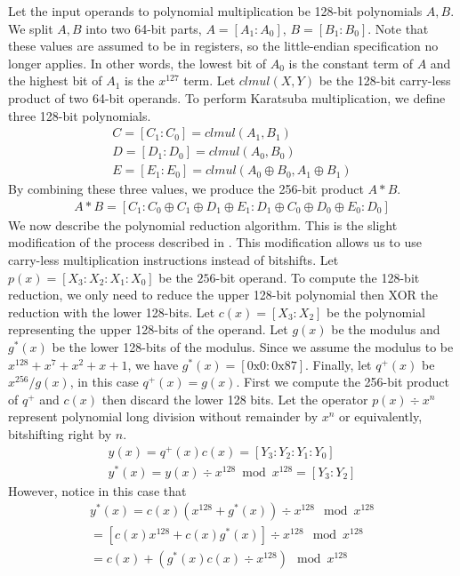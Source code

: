 \documentclass[hctr.tex]{subfiles}
\begin{document}
Let the input operands to polynomial multiplication be 128-bit polynomials $A, B$. We split $A, B$ into two 64-bit parts, $A = [A_1 : A_0]$, $B = [B_1 : B_0]$. Note that these values are assumed to be in registers, so the little-endian specification no longer applies. In other words, the lowest bit of $A_0$ is the constant term of $A$ and the highest bit of $A_1$ is the $x^{127}$ term. Let $clmul(X, Y)$ be the 128-bit carry-less product of two 64-bit operands. To perform Karatsuba multiplication, we define three 128-bit polynomials.
\begin{gather*}
       C = [C_1 : C_0] = clmul(A_1, B_1)\\
       D = [D_1 : D_0] = clmul(A_0, B_0)\\
       E = [E_1 : E_0] = clmul(A_0 \oplus B_0, A_1 \oplus B_1)
\end{gather*}
By combining these three values, we produce the 256-bit product $A * B$.
\begin{align*}
       A * B = [C_1 : C_0 \oplus C_1 \oplus D_1 \oplus E_1 : D_1 \oplus C_0 \oplus D_0 \oplus E_0 : D_0]
\end{align*}
We now describe the polynomial reduction algorithm. This is the slight modification of the process described in \cite{CLMUL}. This modification allows us to use carry-less multiplication instructions instead of bitshifts. Let $p(x) = [X_3 : X_2 : X_1 : X_0]$ be the $256$-bit operand. To compute the 128-bit reduction, we only need to reduce the upper 128-bit polynomial then XOR the reduction with the lower 128-bits. Let $c(x) = [X_3 : X_2]$ be the polynomial representing the upper 128-bits of the operand. Let $g(x)$ be the modulus and $g^*(x)$ be the lower 128-bits of the modulus. Since we assume the modulus to be $x^{128} + x^7 + x^2 + x + 1$, we have $g^*(x) = [\text{0x0} : \text{0x87}]$. Finally, let $q^+(x)$ be $x^{256}/g(x)$, in this case $q^+(x) = g(x)$. First we compute the 256-bit product of $q^+$ and $c(x)$ then discard the lower 128 bits. Let the operator $p(x) \div x^{n}$ represent polynomial long division without remainder by $x^n$ or equivalently, bitshifting right by $n$.
\begin{gather*}
       y(x) = q^+(x)c(x) = [Y_3 : Y_2 : Y_1 : Y_0]\\
       y^*(x) = y(x) \div x^{128} \bmod x^{128} = [Y_3 : Y_2]
\end{gather*}
However, notice in this case that
\begin{gather*}
       y^*(x) = c(x)(x^{128} + g^*(x)) \div x^{128} \mod x^{128}\\
       = [c(x)x^{128} + c(x)g^*(x)] \div x^{128} \mod x^{128}\\
       = c(x) + (g^*(x)c(x) \div x^{128}) \mod x^{128}
\end{gather*}
\end{document}
